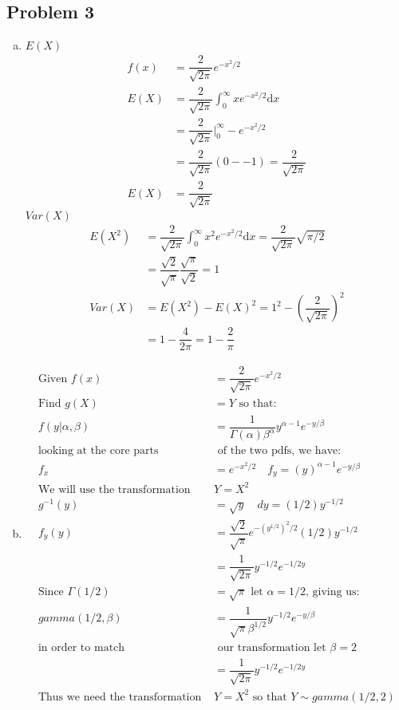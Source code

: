 \documentclass{article}
\newcommand{\dx}{\mathrm{d}x}
\begin{document}
\begin{flushleft}
\section*{Problem 3}
\begin{enumerate}[(a)]
\item 
$E(X)$
\begin{align*}
f(x)&=\dfrac{2}{\sqrt{2\pi}}e^{-x^2/2}\\
E(X)&=\dfrac{2}{\sqrt{2\pi}}\int_{0}^{\infty}xe^{-x^2/2} \dx\\
&=\dfrac{2}{\sqrt{2\pi}}\bigg|_{0}^{\infty}-e^{-x^2/2}\\
&=\dfrac{2}{\sqrt{2\pi}}(0--1)=\dfrac{2}{\sqrt{2\pi}}\\
E(X)&=\dfrac{2}{\sqrt{2\pi}}
\end{align*}
$Var(X)$
\begin{align*}
E(X^2)&=\dfrac{2}{\sqrt{2\pi}}\int_{0}^{\infty}x^2e^{-x^2/2} \dx=\dfrac{2}{\sqrt{2\pi}}\sqrt{\pi/2}\\
&=\dfrac{\sqrt{2}}{\sqrt{\pi}}\dfrac{\sqrt{\pi}}{\sqrt{2}}=1\\
Var(X)&=E(X^2)-E(X)^2=1^2-\left(\dfrac{2}{\sqrt{2\pi}}\right)^2\\
&=1-\dfrac{4}{2\pi}=1-\dfrac{2}{\pi}
\end{align*}
\item 
\begin{align*}
\text{Given } f(x)&=\dfrac{2}{\sqrt{2\pi}}e^{-x^2/2}\\
\text{Find } g(X)&=Y \text{ so that:}\\
f(y|\alpha,\beta)&=\dfrac{1}{\Gamma(\alpha)\beta^{\alpha}}y^{\alpha-1}e^{-y/\beta}\\
\text{looking at the core parts}&\text{ of the two pdfs, we have:}\\
f_x&=e^{-x^2/2} \quad f_y=(y)^{\alpha-1} e^{-y/\beta}\\
\text{We will use the transformation }& Y=X^2\\
g^{-1}(y)&=\sqrt{y} \quad dy=(1/2)y^{-1/2}\\
f_y(y)&=\dfrac{\sqrt{2}}{\sqrt{\pi}}e^{-(y^{1/2})^2/2}(1/2)y^{-1/2}\\
&=\dfrac{1}{\sqrt{2 \pi}}y^{-1/2}e^{-1/2y}\\
\text{Since } \Gamma(1/2)&=\sqrt{\pi} \text{ let } \alpha=1/2 \text{, giving us:}\\
gamma(1/2,\beta)&=\dfrac{1}{\sqrt{\pi}\beta^{1/2}}y^{-1/2}e^{-y/\beta}\\
\text{in order to match}&\text{ our transformation let } \beta=2\\
&=\dfrac{1}{\sqrt{2 \pi}}y^{-1/2}e^{-1/2y}\\
\text{Thus we need the transformation }& Y=X^2 \text{ so that } Y\sim gamma(1/2,2)
\end{align*}
\end{enumerate}
\pagebreak

\end{flushleft}
\end{document}
